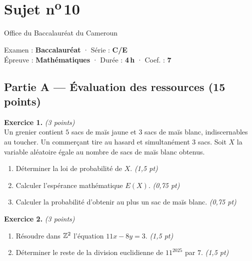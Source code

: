 \section{Sujet n\textsuperscript{o}\,10}
\noindent\begin{minipage}{0.5\linewidth}\footnotesize Office du Baccalauréat du Cameroun\end{minipage}%
\hfill\begin{minipage}{0.45\linewidth}\footnotesize\raggedleft Examen : \textbf{Baccalauréat} · Série : \textbf{C/E}\\
Épreuve : \textbf{Mathématiques} · Durée : \textbf{4\,h} · Coef. : \textbf{7}\end{minipage}
\par\smallskip{\color{onbo}\rule{\linewidth}{1pt}}

\subsection*{Partie A — Évaluation des ressources \hfill (15 points)}

\noindent\textbf{Exercice 1.} \hfill\textit{(3 points)}\\
Un grenier contient $5$ sacs de maïs jaune et $3$ sacs de maïs blanc, indiscernables au
toucher. Un commerçant tire au hasard et simultanément $3$ sacs. Soit $X$ la variable
aléatoire égale au nombre de sacs de maïs blanc obtenus.
\begin{enumerate}[label=\arabic*)]
\item Déterminer la loi de probabilité de $X$. \hfill\textit{(1,5 pt)}
\item Calculer l'espérance mathématique $E(X)$. \hfill\textit{(0,75 pt)}
\item Calculer la probabilité d'obtenir au plus un sac de maïs blanc. \hfill\textit{(0,75 pt)}
\end{enumerate}

\smallskip
\noindent\textbf{Exercice 2.} \hfill\textit{(3 points)}\\
\begin{enumerate}[label=\arabic*)]
\item Résoudre dans $\mathbb{Z}^2$ l'équation $11x-8y=3$. \hfill\textit{(1,5 pt)}
\item Déterminer le reste de la division euclidienne de $11^{2025}$ par $7$. \hfill\textit{(1,5 pt)}
\end{enumerate}

